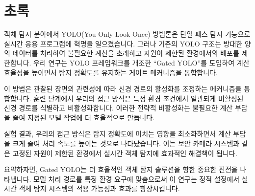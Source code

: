 \section*{초록} 						%

객체 탐지 분야에서 YOLO(You Only Look Once) 방법론은 단일 패스 탐지 기능으로 실시간 응용 프로그램에 혁명을 일으켰습니다. 그러나 기존의 YOLO 구조는 방대한 양의 데이터를 처리하여 불필요한 계산을 초래하고 자원이 제한된 환경에서의 배포를 제한합니다. 우리 연구는 YOLO 프레임워크를 개조한 ``Gated YOLO''를 도입하여 계산 효율성을 높이면서 탐지 정확도를 유지하는 게이트 메커니즘을 통합합니다.

이 방법은 관찰된 장면의 관련성에 따라 신경 경로의 활성화를 조정하는 메커니즘을 통합합니다. 훈련 단계에서 우리의 접근 방식은 특정 환경 조건에서 일관되게 비활성된 신경 경로를 식별하고 비활성화합니다. 이러한 전략적 비활성화는 불필요한 계산 부담을 줄여 지정된 모델 작업에 더 효율적으로 만듭니다.

실험 결과, 우리의 접근 방식은 탐지 정확도에 미치는 영향을 최소화하면서 계산 부담을 크게 줄여 처리 속도를 높이는 것으로 나타났습니다. 이는 보안 카메라 시스템과 같은 고정된 자원이 제한된 환경에서 실시간 객체 탐지에 효과적인 해결책이 됩니다.

요약하자면, Gated YOLO는 더 효율적인 객체 탐지 솔루션을 향한 중요한 진전을 나타냅니다. 모델 처리 경로를 특정 환경 요구에 맞춤으로써 이 연구는 정적 설정에서 실시간 객체 탐지 시스템의 적용 가능성과 효과를 향상시킵니다.

\clearpage